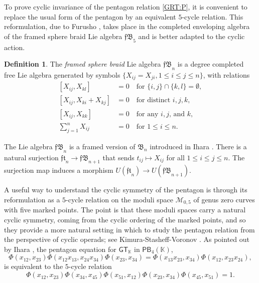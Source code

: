 \documentclass{amsart}
\newcommand{\kk}{\mathbb{K}}    %
\newcommand{\GT}{{\mathsf{GT}}}
\newcommand{\PB}{\mathsf{PB}} %
\theoremstyle{definition}
\newtheorem{definition}[theorem]{Definition}%
\numberwithin{equation}{section}
\begin{document}
To prove cyclic invariance of the pentagon relation \eqref{GRT:P}, it is convenient to replace the usual form of the pentagon by an equivalent $5$-cycle relation. This reformulation, due to Furusho \cite{Furusho_pentagon}, takes place in the completed enveloping algebra of the framed sphere braid Lie algebra $\mathfrak{fB}_5$ and is better adapted to the cyclic action.

\begin{definition}
The \emph{framed sphere braid} Lie algebra $\mathfrak{fB}_n$ is a degree completed free Lie algebra generated by symbols $\{X_{ij} = X_{ji}, 1\leq i \leq j\leq n\}$, with relations 
\begin{equation}\label{equ:spherebraid_rel}
\begin{aligned}
[X_{ij}, X_{kl}] &= 0 \quad \text{for $\{i,j\}\cap\{k,l\}=\emptyset$}, \\
[X_{ij},X_{ki}+X_{kj}] &= 0  \quad  \text{for distinct $i,j,k$}, \\ 
[X_{ij}, X_{kk}] &= 0 \quad \text{for any $i,j$, and $k$}, \\
\sum_{j = 1}^{n} X_{ij} &=  0 \quad \text{for $1 \leq i \leq n$}. 
\end{aligned}
\end{equation}    
\end{definition}

The Lie algebra $\mathfrak{fB}_n$ is a framed version of $\mathfrak{B}_n$ introduced in Ihara \cite[Section 5.3]{ihara_braids}. There is a natural surjection $ \mathfrak{ft}_n \rightarrow \mathfrak{fB}_{n+1}$ that sends $t_{ij} \mapsto X_{ij}$ for all $1 \leq i \leq j \leq n$. The surjection map induces a morphism $U(\mathfrak{ft}_n) \rightarrow U(\mathfrak{fB}_{n+1})$. 

A useful way to understand the cyclic symmetry of the pentagon is through its reformulation as a $5$-cycle relation on the moduli space $\mathcal{M}_{0,5}$ of genus zero curves with five marked points. The point is that these moduli spaces carry a natural cyclic symmetry, coming from the cyclic ordering of the marked points, and so they provide a more natural setting in which to study the pentagon relation from the perspective of cyclic operads; see Kimura-Stasheff-Voronov \cite{Voronov_1995_cyclicModuli}. As pointed out by Ihara \cite[Section 5.3]{ihara_braids}, the pentagon equation for $\GT_{\kk}$ in $\PB_4(\kk)$,
\begin{equation}\label{GT:P}
    \Phi(x_{12}, x_{23}) \Phi(x_{12}x_{13}, x_{24}x_{34}) \Phi(x_{23}, x_{34})
    =
    \Phi(x_{13}x_{23}, x_{34})  \Phi(x_{12}, x_{23}x_{24}),
\end{equation}
is equivalent to the $5$-cycle relation
\[
\Phi(x_{12},x_{23})  \Phi(x_{34},x_{45})  \Phi(x_{51},x_{12})  \Phi(x_{23},x_{34})  \Phi(x_{45},x_{51}) = 1.
\]
\end{document}
